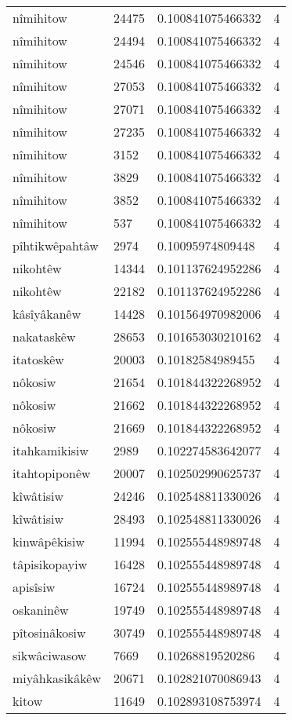 \begin{longtable}{llll}
nîmihitow & 24475 & 0.100841075466332 & 4 \\
nîmihitow & 24494 & 0.100841075466332 & 4 \\
nîmihitow & 24546 & 0.100841075466332 & 4 \\
nîmihitow & 27053 & 0.100841075466332 & 4 \\
nîmihitow & 27071 & 0.100841075466332 & 4 \\
nîmihitow & 27235 & 0.100841075466332 & 4 \\
nîmihitow & 3152 & 0.100841075466332 & 4 \\
nîmihitow & 3829 & 0.100841075466332 & 4 \\
nîmihitow & 3852 & 0.100841075466332 & 4 \\
nîmihitow & 537 & 0.100841075466332 & 4 \\
pîhtikwêpahtâw & 2974 & 0.10095974809448 & 4 \\
nikohtêw & 14344 & 0.101137624952286 & 4 \\
nikohtêw & 22182 & 0.101137624952286 & 4 \\
kâsîyâkanêw & 14428 & 0.101564970982006 & 4 \\
nakataskêw & 28653 & 0.101653030210162 & 4 \\
itatoskêw & 20003 & 0.10182584989455 & 4 \\
nôkosiw & 21654 & 0.101844322268952 & 4 \\
nôkosiw & 21662 & 0.101844322268952 & 4 \\
nôkosiw & 21669 & 0.101844322268952 & 4 \\
itahkamikisiw & 2989 & 0.102274583642077 & 4 \\
itahtopiponêw & 20007 & 0.102502990625737 & 4 \\
kîwâtisiw & 24246 & 0.102548811330026 & 4 \\
kîwâtisiw & 28493 & 0.102548811330026 & 4 \\
kinwâpêkisiw & 11994 & 0.102555448989748 & 4 \\
tâpisikopayiw & 16428 & 0.102555448989748 & 4 \\
apisîsiw & 16724 & 0.102555448989748 & 4 \\
oskaninêw & 19749 & 0.102555448989748 & 4 \\
pîtosinâkosiw & 30749 & 0.102555448989748 & 4 \\
sikwâciwasow & 7669 & 0.10268819520286 & 4 \\
miyâhkasikâkêw & 20671 & 0.102821070086943 & 4 \\
kitow & 11649 & 0.102893108753974 & 4 \\

\end{longtable}
